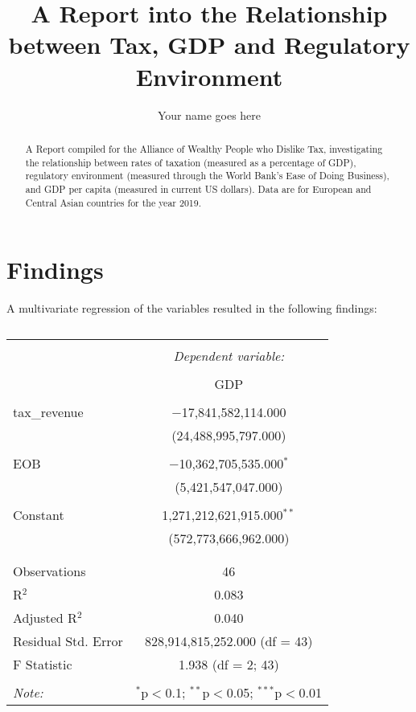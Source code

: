 \documentclass[]{report}
\title{A Report into the Relationship between Tax, GDP and Regulatory Environment}
\author{Your name goes here}
\begin{document}
\maketitle

\begin{abstract}
A Report compiled for the Alliance of Wealthy People who Dislike Tax, investigating the relationship between rates of taxation (measured as a percentage of GDP), regulatory environment (measured through the World Bank's Ease of Doing Business), and GDP per capita (measured in current US dollars). Data are for European and Central Asian countries for the year 2019.
\end{abstract}

\section{Findings}
A multivariate regression of the variables resulted in the following findings:


\begin{table}[!htbp] \centering 
	\caption{} 
	\label{} 
	\begin{tabular}{@{\extracolsep{5pt}}lc} 
		\\[-1.8ex]\hline 
		\hline \\[-1.8ex] 
		& \multicolumn{1}{c}{\textit{Dependent variable:}} \\ 
		\cline{2-2} 
		\\[-1.8ex] & GDP \\ 
		\hline \\[-1.8ex] 
		tax\_revenue & $-$17,841,582,114.000 \\ 
		& (24,488,995,797.000) \\ 
		& \\ 
		EOB & $-$10,362,705,535.000$^{*}$ \\ 
		& (5,421,547,047.000) \\ 
		& \\ 
		Constant & 1,271,212,621,915.000$^{**}$ \\ 
		& (572,773,666,962.000) \\ 
		& \\ 
		\hline \\[-1.8ex] 
		Observations & 46 \\ 
		R$^{2}$ & 0.083 \\ 
		Adjusted R$^{2}$ & 0.040 \\ 
		Residual Std. Error & 828,914,815,252.000 (df = 43) \\ 
		F Statistic & 1.938 (df = 2; 43) \\ 
		\hline 
		\hline \\[-1.8ex] 
		\textit{Note:}  & \multicolumn{1}{r}{$^{*}$p$<$0.1; $^{**}$p$<$0.05; $^{***}$p$<$0.01} \\ 
	\end{tabular} 
\end{table} 


\end{document}
